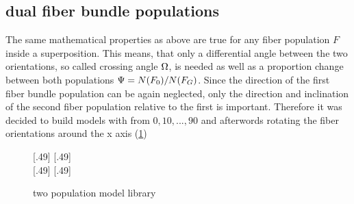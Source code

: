 \subsection{dual fiber bundle populations}
The same mathematical properties as above are true for any fiber population $F$ inside a superposition.
This means, that only a differential angle between the two orientations, so called crossing angle $\textnormal{$\Omega$}$, is needed as well as a proportion change between both populations $\textnormal{$\Psi$}{} = N(F_0)/N(F_G)$.
% 
Since the direction of the first fiber bundle population can be again neglected, only the direction and inclination of the second fiber population relative to the first is important. Therefore it was decided to build models with \modelOmega{} from ${0,10,...,90}$ and afterwords rotating the fiber orientations around the x axis (\cref{fig:twomodelpop})
% 
% 
\begin{figure}[p]
\centering
\def\tikzwidth{0.45*\textwidth}
[.49\textwidth]{}\hfill
{}
[.49\textwidth]{}
% 
\\
% 
[.49\textwidth]{}\hfill
{}
[.49\textwidth]{}
\caption{two population model library}
\label{fig:twomodelpop}
\end{figure}
% 
%  
% 
